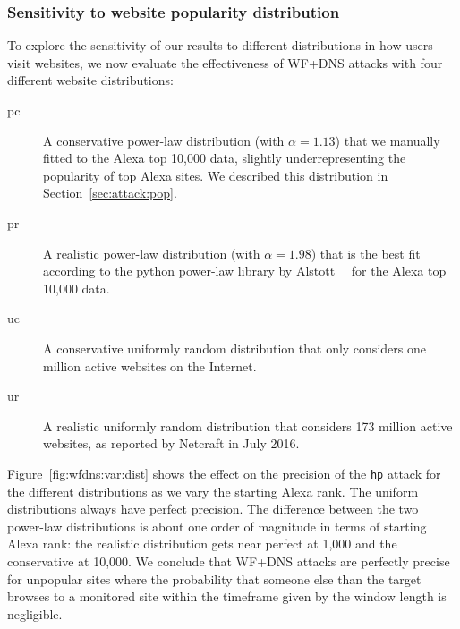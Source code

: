
\subsubsection{Sensitivity to website popularity distribution}

To explore the sensitivity of our results to different distributions in
how users visit websites, we now evaluate the effectiveness of WF+DNS
attacks with four different website distributions:
\begin{description}
	\item[pc] A conservative power-law distribution
	(with $\alpha=1.13$)
	that we manually fitted to the Alexa top 10,000 data,
	slightly underrepresenting the popularity of top Alexa sites.
	We described this distribution in Section~\ref{sec:attack:pop}.
	\item[pr] A realistic power-law distribution
	(with $\alpha=1.98$)
	that is the best fit according to
	the python power-law library by Alstott~\ea~\cite{power-law} for the Alexa
	top 10,000 data.
	\item[uc] A conservative uniformly random distribution that
	only considers one million active websites on the Internet.
	\item[ur] A realistic uniformly random distribution that
          considers 173 million active websites, as reported by Netcraft
          in July 2016. 
\end{description}
Figure~\ref{fig:wfdns:var:dist} shows the effect on the precision of the
\texttt{hp} attack for the different distributions as we vary the starting
Alexa rank. The uniform distributions always have perfect precision.
The difference between the two power-law distributions is about one order of
magnitude in terms of starting Alexa rank: the realistic distribution gets
near perfect at 1,000 and the conservative at 10,000.
We conclude that WF+DNS attacks are perfectly precise for unpopular sites
where the probability that someone else than the target browses to a monitored
site within the timeframe given by the window length is negligible.


